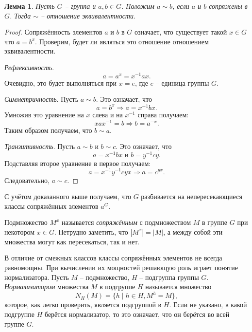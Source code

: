 \documentclass{article}
\newtheorem{lemma}{Лемма}[section]
\begin{document}
\begin{lemma} \label{gachimuchi}
    Пусть $G$ --  группа и $a, b \in G$. Положим $a \sim b$, если $a$ и $b$ сопряжены в $G$. Тогда $\sim$ -- отношение эквивалентности.
\end{lemma}

\begin{proof}
    Сопряжённость элементов $a$ и $b$ в $G$ означает, что существует такой $x \in G$ что $a = b^x$. Проверим, будет ли являться это отношение отношением эквивалентности.
    
    \textit{Рефлексивность}. $$ a = a^x = x^{-1} a x. $$ Очевидно, это будет выполняться при $x = e$, где $e$ -- единица группы $G$.

    \textit{Симметричность}. Пусть $a \sim b$. Это означает, что $$ a = b^x \Rightarrow a = x^{-1} b x. $$ Умножив это уравнение на $x$ слева и на $x^{-1}$ справа получаем: $$ x a x^{-1} = b \Rightarrow b = a^{-x}.$$ Таким образом получаем, что $b \sim a$.
    
    \textit{Транзитивность}. Пусть $a \sim b$ и $b \sim c$. Это означает, что $$a = x^{-1} b x \text{ и } b = y^{-1} c y.$$ Подставляя второе уравнение в первое получаем: $$ a = x^{-1} y^{-1} c y x \Rightarrow a = c^{yx}. $$ Следовательно, $a \sim c$.
\end{proof}

С учётом доказанного выше получаем, что $G$ разбивается на непересекающиеся классы сопряжённых элементов $a^G$.

Подмножество $M^x$ называется \textit{сопряжённым} с подмножеством $M$ в группе $G$ при некотором $x \in G$. Нетрудно заметить, что $| M^x | = |M|$, а между собой эти множества могут как пересекаться, так и нет.

В отличие от смежных классов классы сопряжённых элементов не всегда равномощны. При вычислении их мощностей решающую роль играет понятие нормализатора. Пусть $M$ -- подмножество, $H$ -- подгруппа группы $G$. \textit{Нормализатором} множества $M$ в подгруппе $H$ называется множество $$ N_H(M) = \{ h \mid h \in H, M^h = M \}, $$ которое, как легко проверить, является подгруппой в $H$. Если не указано, в какой подгруппе $H$ берётся нормализатор, то это означает, что он берётся во всей группе $G$.
\end{document}
